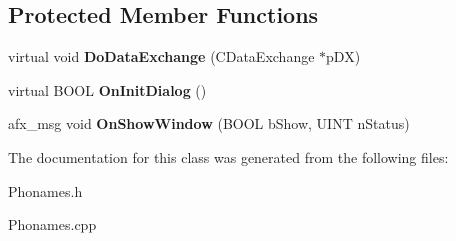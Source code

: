 \subsection*{Protected Member Functions}
\begin{DoxyCompactItemize}
\item 
\hypertarget{class_c_phonames_a701215d1f79d98cce649221fc8b8403a}{virtual void {\bfseries Do\-Data\-Exchange} (C\-Data\-Exchange $\ast$p\-D\-X)}\label{class_c_phonames_a701215d1f79d98cce649221fc8b8403a}

\item 
\hypertarget{class_c_phonames_a4b2035c50106b5a269311643a0eff3d8}{virtual B\-O\-O\-L {\bfseries On\-Init\-Dialog} ()}\label{class_c_phonames_a4b2035c50106b5a269311643a0eff3d8}

\item 
\hypertarget{class_c_phonames_adc44ff46f5ad1a869156b7d2ba49c447}{afx\-\_\-msg void {\bfseries On\-Show\-Window} (B\-O\-O\-L b\-Show, U\-I\-N\-T n\-Status)}\label{class_c_phonames_adc44ff46f5ad1a869156b7d2ba49c447}

\end{DoxyCompactItemize}


The documentation for this class was generated from the following files\-:\begin{DoxyCompactItemize}
\item 
Phonames.\-h\item 
Phonames.\-cpp\end{DoxyCompactItemize}
